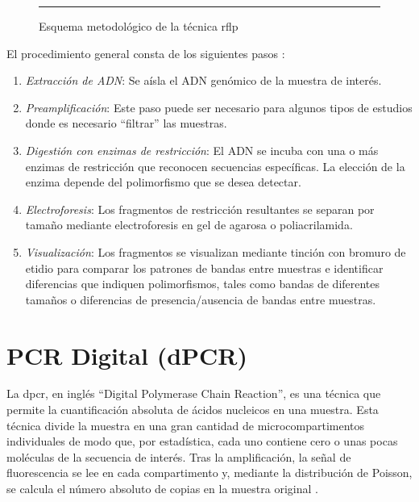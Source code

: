 \documentclass{AsignaturaResumen}
\begin{document}
\begin{figure}
    \centering
    \resizebox{\linewidth}{!}{}
    \rule{\linewidth}{0.5pt}
    \caption{Esquema metodológico de la técnica \acrshort{rflp}}
    \label{fig:esquema_de_rflp}
\end{figure}

El procedimiento general consta de los siguientes pasos \citep{tarachApplicationPolymeraseChain2021}:

\begin{enumerate}
    \item \emph{Extracción de ADN}: Se aísla el ADN genómico de la muestra de interés.
    \item \emph{Preamplificación}: Este paso puede ser necesario para algunos tipos de estudios donde es necesario ``filtrar'' las muestras.
    \item \emph{Digestión con enzimas de restricción}: El ADN se incuba con una o más enzimas de restricción que reconocen secuencias específicas. La elección de la enzima depende del polimorfismo que se desea detectar.
    \item \emph{Electroforesis}: Los fragmentos de restricción resultantes se separan por tamaño mediante electroforesis en gel de agarosa o poliacrilamida.
    \item \emph{Visualización}: Los fragmentos se visualizan mediante tinción con bromuro de etidio para comparar los patrones de bandas entre muestras e identificar diferencias que indiquen polimorfismos, tales como bandas de diferentes tamaños o diferencias de presencia/ausencia de bandas entre muestras.
\end{enumerate}

    

    



\section{PCR Digital (dPCR)}

La \acrfull{dpcr}, en inglés ``Digital Polymerase Chain Reaction'', es una técnica que permite la cuantificación absoluta de ácidos nucleicos en una muestra. Esta técnica divide la muestra en una gran cantidad de microcompartimentos individuales de modo que, por estadística, cada uno contiene cero o unas pocas moléculas de la secuencia de interés. Tras la amplificación, la señal de fluorescencia se lee en cada compartimento y, mediante la distribución de Poisson, se calcula el número absoluto de copias en la muestra original \citep{maoPrinciplesDigitalPCR2019}.
\end{document}
